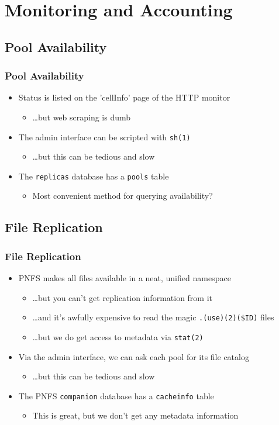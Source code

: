 \documentclass{beamer}
\begin{document}
\section{Monitoring and Accounting}
\subsection{Pool Availability}
\begin{frame}
\frametitle{Pool Availability}
\begin{itemize}
    \item Status is listed on the 'cellInfo' page of the HTTP monitor
    \begin{itemize}
        \item \dots{}but web scraping is dumb
    \end{itemize}
    \item The admin interface can be scripted with {\tt sh(1)}
    \begin{itemize}
        \item \dots{}but this can be tedious and slow
    \end{itemize}
    \item The {\tt replicas} database has a {\tt pools} table
    \begin{itemize}
        \item Most convenient method for querying availability?
    \end{itemize}
\end{itemize}
\end{frame}

\subsection{File Replication}
\begin{frame}
\frametitle{File Replication}
\begin{itemize}
    \item PNFS makes all files available in a neat, unified namespace
    \begin{itemize}
        \item \dots{}but you can't get replication information from it
        \item \dots{}and it's awfully expensive to read the magic {\tt .(use)(2)(\$ID)} files
        \item \dots{}but we do get access to metadata via {\tt stat(2)}
    \end{itemize}
    \item Via the admin interface, we can ask each pool for its file catalog
    \begin{itemize}
        \item \dots{}but this can be tedious and slow
    \end{itemize}
    \item The PNFS {\tt companion} database has a {\tt cacheinfo} table
    \begin{itemize}
        \item This is great, but we don't get any metadata information
    \end{itemize}
\end{itemize}
\end{frame}
\end{document}
